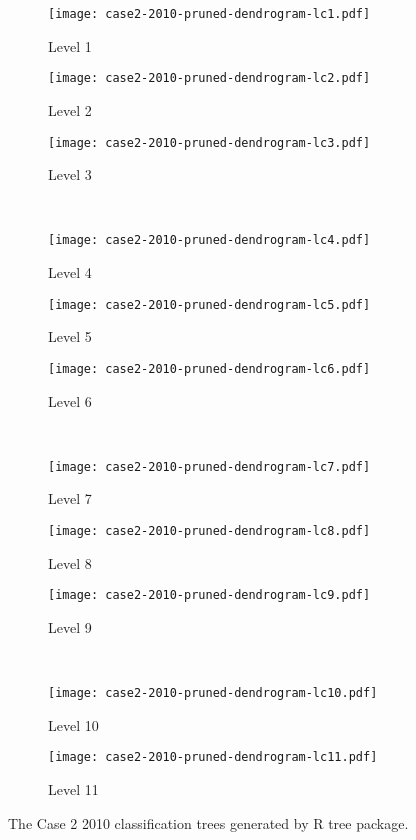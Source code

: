 \begin{appendices}

\begin{figure}[!ht] \centering
	\captionsetup[subfigure]{width=2.0in}
	\begin{subfigure}[t]{0.32\textwidth}
		\texttt{[image: case2-2010-pruned-dendrogram-lc1.pdf]}
		\caption{Level 1}
	\end{subfigure}
	\begin{subfigure}[t]{0.32\textwidth}
		\texttt{[image: case2-2010-pruned-dendrogram-lc2.pdf]}
		\caption{Level 2}
	\end{subfigure}
	\begin{subfigure}[t]{0.32\textwidth}
		\texttt{[image: case2-2010-pruned-dendrogram-lc3.pdf]}
		\caption{Level 3}
	\end{subfigure}\\
	\vspace{5pt}
	\begin{subfigure}[t]{0.32\textwidth}
		\texttt{[image: case2-2010-pruned-dendrogram-lc4.pdf]}
		\caption{Level 4}
	\end{subfigure}
	\begin{subfigure}[t]{0.32\textwidth}
		\texttt{[image: case2-2010-pruned-dendrogram-lc5.pdf]}
		\caption{Level 5}
	\end{subfigure}
	\begin{subfigure}[t]{0.32\textwidth}
		\texttt{[image: case2-2010-pruned-dendrogram-lc6.pdf]}
		\caption{Level 6}
	\end{subfigure}\\
	\vspace{5pt}	
	\begin{subfigure}[t]{0.32\textwidth}
		\texttt{[image: case2-2010-pruned-dendrogram-lc7.pdf]}
		\caption{Level 7}
	\end{subfigure}
	\begin{subfigure}[t]{0.32\textwidth}
		\texttt{[image: case2-2010-pruned-dendrogram-lc8.pdf]}
		\caption{Level 8}
	\end{subfigure}
	\begin{subfigure}[t]{0.32\textwidth}
		\texttt{[image: case2-2010-pruned-dendrogram-lc9.pdf]}
		\caption{Level 9}
	\end{subfigure}\\
	\vspace{5pt}
	\begin{subfigure}[t]{0.32\textwidth}
		\texttt{[image: case2-2010-pruned-dendrogram-lc10.pdf]}
		\caption{Level 10}
	\end{subfigure}
	\begin{subfigure}[t]{0.32\textwidth}
		\texttt{[image: case2-2010-pruned-dendrogram-lc11.pdf]}
		\caption{Level 11}
	\end{subfigure}
	\vspace{5pt}
	\caption[The Case 2 2010 classification trees generated by R tree package.]{The Case 2 2010 classification trees generated by R tree package.}
	\label{fig: appendix-fig.c15.tree}
\end{figure}


\end{appendices}
